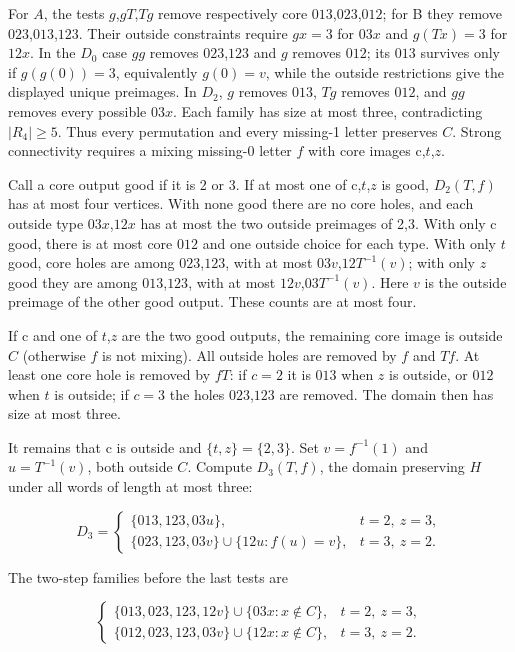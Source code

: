 \documentclass[11pt]{article}
\theoremstyle{definition}
\theoremstyle{plain}
\begin{document}
For \(A\), the tests \(g\),\(gT\),\(Tg\) remove respectively core \(013\),\(023\),\(012\);
for B they remove \(023\),\(013\),\(123\). Their outside constraints require
\(gx=3\) for \(03x\) and \(g(Tx)=3\) for \(12x\). In the \(D_{0}\) case
\(gg\) removes \(023\),\(123\) and \(g\) removes \(012\); its \(013\) survives only if
\(g(g(0))=3\), equivalently \(g(0)=v\), while the outside restrictions give
the displayed unique preimages. In \(D_{2}\), \(g\) removes \(013\), \(Tg\)
removes \(012\), and \(gg\) removes every possible \(03x\).  Each family has size at most three, contradicting
\(|R_{4}|\ge 5\). Thus every permutation and every missing-1 letter
preserves \(C\). Strong connectivity requires a mixing missing-0
letter \(f\) with core images c,\(t\),\(z\).

Call a core output good if it is 2 or 3. If at most one of
c,\(t\),\(z\) is good, \(D_{2}(T,f)\) has at most four vertices. With
none good there are no core holes, and each outside type \(03x\),\(12x\)
has at most the two outside preimages of 2,3. With only c good, there is
at most core \(012\) and one outside choice for each type. With only \(t\)
good, core holes are among \(023\),\(123\), with at most
\(03v\),\(12\)\(T^{-1}(v)\); with only \(z\) good they are among \(013\),\(123\),
with at most \(12v\),\(03\)\(T^{-1}(v)\). Here \(v\) is the outside preimage
of the other good output. These counts are at most four.

If c and one of \(t\),\(z\) are the two good outputs, the remaining core
image is outside \(C\) (otherwise \(f\) is not mixing). All outside
holes are removed by \(f\) and \(Tf\). At least one core hole is removed by
\(fT\): if \(c=2\) it is \(013\) when \(z\) is outside, or \(012\) when \(t\) is
outside; if \(c=3\) the holes \(023\),\(123\) are removed. The domain then has
size at most three.

It remains that c is outside and \(\{t,z\}=\{2,3\}\). Set
\(v=f^{-1}(1)\) and \(u=T^{-1}(v)\), both outside \(C\). Compute
\(D_{3}(T,f)\), the domain preserving \(H\) under all words of length at
most three:

\[
D_3=\begin{cases}\{013,123,03u\},&t=2,\ z=3,\\\{023,123,03v\}\cup\{12u:f(u)=v\},&t=3,\ z=2.\end{cases}
\]

The two-step families before the last tests are

\[
\begin{cases}\{013,023,123,12v\}\cup\{03x:x\notin C\},&t=2,\ z=3,\\\{012,023,123,03v\}\cup\{12x:x\notin C\},&t=3,\ z=2.\end{cases}
\]
\end{document}
